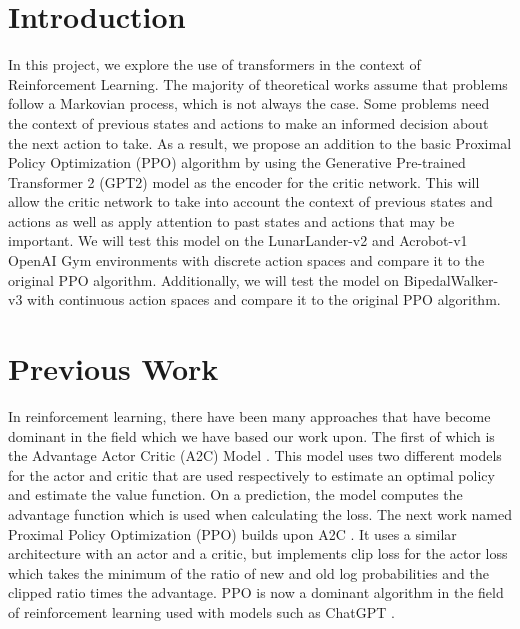 \section{Introduction}
In this project, we explore the use of transformers in the context of Reinforcement Learning. The majority of theoretical works assume that problems follow a Markovian process, which is not always the case. Some problems need the context of previous states and actions to make an informed decision about the next action to take. As a result, we propose an addition to the basic Proximal Policy Optimization (PPO) algorithm by using the Generative Pre-trained Transformer 2 (GPT2) model as the encoder for the critic network. This will allow the critic network to take into account the context of previous states and actions as well as apply attention to past states and actions that may be important. We will test this model on the LunarLander-v2 and Acrobot-v1 OpenAI Gym environments with discrete action spaces and compare it to the original PPO algorithm. Additionally, we will test the model on BipedalWalker-v3 with continuous action spaces and compare it to the original PPO algorithm.



\section{Previous Work}

In reinforcement learning, there have been many approaches that have become dominant in the field which we have based our work upon.
The first of which is the Advantage Actor Critic (A2C) Model \cite{mnih2016asynchronous}. This model uses two different models for the actor and critic that are used respectively to estimate
an optimal policy and estimate the value function. On a prediction, the model computes the advantage function which is used when calculating the loss.
The next work named Proximal Policy Optimization (PPO) builds upon A2C \cite{schulman2017proximal}. It uses a similar architecture with an actor and a critic,
but implements clip loss for the actor loss which takes the minimum of the ratio of new and old log probabilities and the clipped ratio times the advantage. PPO
is now a dominant algorithm in the field of reinforcement learning used with models such as ChatGPT \cite{openai_2022}.


